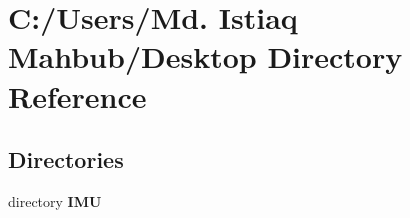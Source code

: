 \section{C\+:/\+Users/\+Md. Istiaq Mahbub/\+Desktop Directory Reference}
\label{dir_6eb9a959986c7ff584d5a0f65faace29}
\subsection*{Directories}
\begin{DoxyCompactItemize}
\item 
directory \textbf{ I\+MU}
\end{DoxyCompactItemize}
